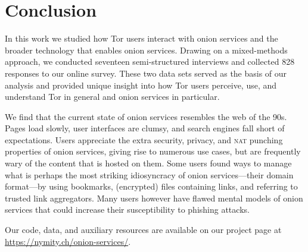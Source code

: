 \section{Conclusion}
\label{sec:conclusion}

In this work we studied how Tor users interact with onion services and the
broader technology that enables onion services.  Drawing on a mixed-methods
approach, we conducted seventeen semi-structured interviews and collected 828
responses to our online survey.  These two data sets served as the basis of our
analysis and provided unique insight into how Tor users perceive, use, and
understand Tor in general and onion services in particular.

We find that the current state of onion services resembles the web of the 90s.
Pages load slowly, user interfaces are clumsy, and search engines fall short of
expectations.  Users appreciate the extra security, privacy, and \textsc{nat}
punching properties of onion services, giving rise to numerous use cases, but
are frequently wary of the content that is hosted on them.  Some users found
ways to manage what is perhaps the most striking idiosyncracy of onion
services---their domain format---by using bookmarks, (encrypted) files
containing links, and referring to trusted link aggregators.  Many users however
have flawed mental models of onion services that could increase their
susceptibility to phishing attacks.

Our code, data, and auxiliary resources are available on our project page at
\url{https://nymity.ch/onion-services/}.
